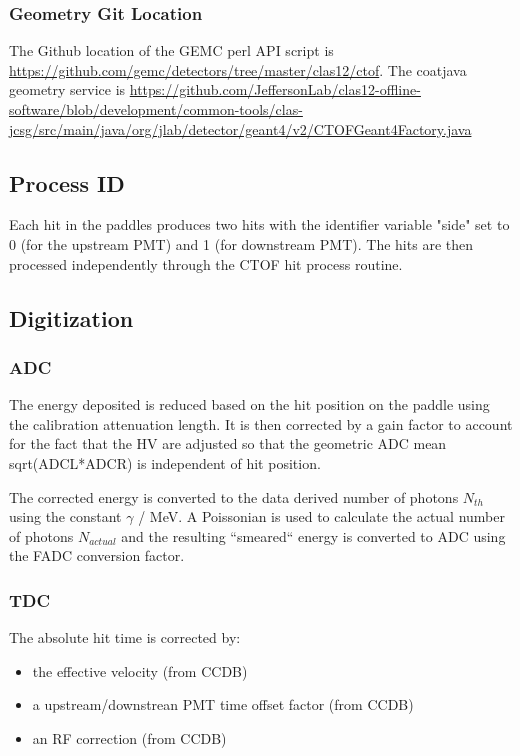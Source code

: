 \subsubsection{Geometry Git Location}
The Github location of the GEMC perl API script is \url{https://github.com/gemc/detectors/tree/master/clas12/ctof}.
The coatjava geometry service is \url{https://github.com/JeffersonLab/clas12-offline-software/blob/development/common-tools/clas-jcsg/src/main/java/org/jlab/detector/geant4/v2/CTOFGeant4Factory.java}

\subsection{Process ID}

Each hit in the paddles produces two hits with the identifier variable "side" set to 0 (for the upstream PMT) and 1 (for downstream PMT).
The hits are then processed independently through the CTOF hit process routine.

\subsection{Digitization}

\subsubsection{ADC}

The energy deposited is reduced based on the hit position on the paddle using the calibration attenuation length. It is then corrected by a gain factor
to account for the fact that the HV are adjusted so that the geometric ADC mean sqrt(ADCL*ADCR) is independent of hit position.

The corrected energy is converted to the data derived number of photons $N_{th}$ using the constant $\gamma$ / MeV. A Poissonian is used to
calculate the actual number of photons $N_{actual}$ and the resulting ``smeared`` energy is converted to ADC using the FADC conversion factor.


\subsubsection{TDC}

The absolute hit time is corrected by:

\begin{itemize}
	\item the effective velocity (from CCDB)
	\item a upstream/downstrean PMT time offset factor (from CCDB)
	\item an RF correction (from CCDB)
\end{itemize}

